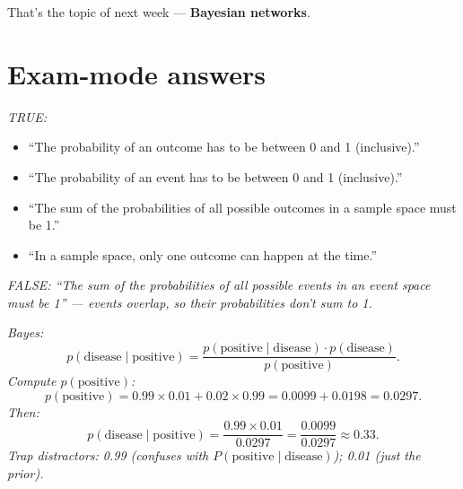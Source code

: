 \documentclass[11pt, a4paper]{article}
\begin{document}
That's the topic of next week — \textbf{Bayesian networks}.

\section{Exam-mode answers}

\begin{exambox}
\textit{TRUE:}
\begin{itemize}[leftmargin=*, itemsep=0pt, topsep=0pt]
  \item ``The probability of an outcome has to be between 0 and 1 (inclusive).''
  \item ``The probability of an event has to be between 0 and 1 (inclusive).''
  \item ``The sum of the probabilities of all possible outcomes in a sample space must be 1.''
  \item ``In a sample space, only one outcome can happen at the time.''
\end{itemize}
\textit{FALSE: ``The sum of the probabilities of all possible \emph{events} in an event space must be 1'' — events overlap, so their probabilities don't sum to 1.}
\end{exambox}

\begin{exambox}[(MCQ): A medical test has $p(\text{positive} \mid \text{disease}) = 0.99$ and $p(\text{negative} \mid \neg\text{disease}) = 0.98$. The disease affects 1 in 100 people. Given a positive test, what is the probability the person has the disease?]
\textit{Bayes:}
\[
p(\text{disease} \mid \text{positive}) = \frac{p(\text{positive} \mid \text{disease}) \cdot p(\text{disease})}{p(\text{positive})}.
\]
\textit{Compute $p(\text{positive})$:}
\[
p(\text{positive}) = 0.99 \times 0.01 + 0.02 \times 0.99 = 0.0099 + 0.0198 = 0.0297.
\]
\textit{Then:}
\[
p(\text{disease} \mid \text{positive}) = \frac{0.99 \times 0.01}{0.0297} = \frac{0.0099}{0.0297} \approx 0.33.
\]
\textit{Trap distractors: 0.99 (confuses with $P(\text{positive} \mid \text{disease})$); 0.01 (just the prior).}
\end{exambox}
\end{document}
